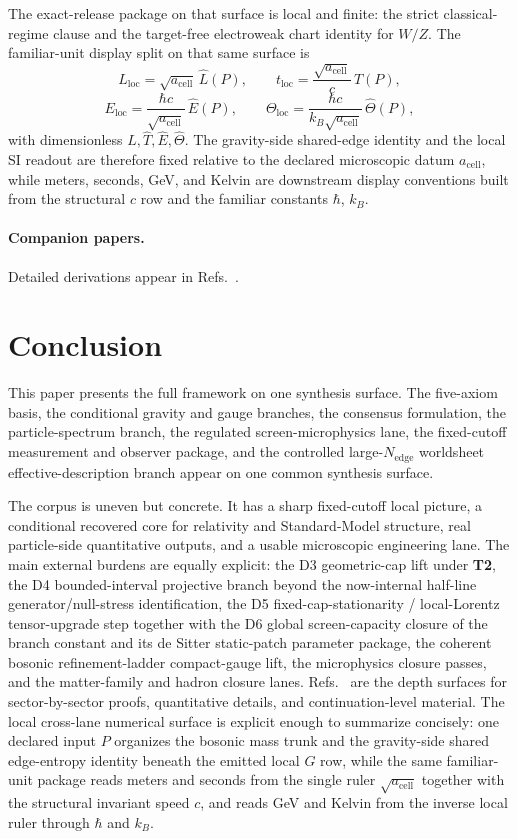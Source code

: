 The exact-release package on that surface is local and finite: the strict classical-regime clause
and the target-free electroweak chart identity for \(W/Z\).
The familiar-unit display split on that same surface is
\[
L_{\mathrm{loc}}=\sqrt{a_{\mathrm{cell}}}\,\widehat L(P),\qquad
t_{\mathrm{loc}}=\frac{\sqrt{a_{\mathrm{cell}}}}{c}\,\widehat T(P),
\]
\[
E_{\mathrm{loc}}=\frac{\hbar c}{\sqrt{a_{\mathrm{cell}}}}\,\widehat E(P),\qquad
\Theta_{\mathrm{loc}}=\frac{\hbar c}{k_B\sqrt{a_{\mathrm{cell}}}}\,\widehat\Theta(P),
\]
with dimensionless \(\widehat L,\widehat T,\widehat E,\widehat\Theta\). The gravity-side
shared-edge identity and the local SI readout are therefore fixed relative to the declared
microscopic datum \(a_{\mathrm{cell}}\), while meters, seconds, GeV, and Kelvin are downstream
display conventions built from the structural \(c\) row and the familiar constants \(\hbar\),
\(k_B\).

\paragraph{Companion papers.}
Detailed derivations appear in Refs.~\cite{ophcompact,ophconsensus,ophmicrophysics,ophparticles}.

\section{Conclusion}

This paper presents the full framework on one synthesis surface. The five-axiom basis, the
conditional gravity and gauge branches, the consensus formulation, the particle-spectrum branch,
the regulated screen-microphysics lane, the fixed-cutoff measurement and observer package, and the
controlled large-\(N_{\mathrm{edge}}\) worldsheet effective-description branch appear on one
common synthesis surface.

The corpus is uneven but concrete. It has a sharp
fixed-cutoff local picture, a conditional recovered core for relativity and Standard-Model
structure, real particle-side quantitative outputs, and a usable microscopic engineering lane. The
main external burdens are equally explicit: the D3 geometric-cap lift under \textbf{T2}, the D4
bounded-interval projective branch beyond the now-internal half-line generator/null-stress
identification, the D5
fixed-cap-stationarity / local-Lorentz tensor-upgrade step together with the D6 global
screen-capacity closure of the branch constant and its de Sitter static-patch parameter
package, the coherent bosonic refinement-ladder compact-gauge
lift, the microphysics closure passes, and the matter-family and hadron closure lanes.
Refs.~\cite{ophcompact,ophconsensus,ophmicrophysics,ophparticles} are the depth surfaces for
sector-by-sector proofs, quantitative details, and continuation-level material. The local
cross-lane numerical surface is explicit enough to summarize concisely: one declared input \(P\)
organizes the bosonic mass trunk and the gravity-side shared edge-entropy identity beneath the
emitted local \(G\) row, while the same familiar-unit package reads meters and seconds from the
single ruler \(\sqrt{a_{\mathrm{cell}}}\) together with the structural invariant speed \(c\), and
reads GeV and Kelvin from the inverse local ruler through \(\hbar\) and \(k_B\).
